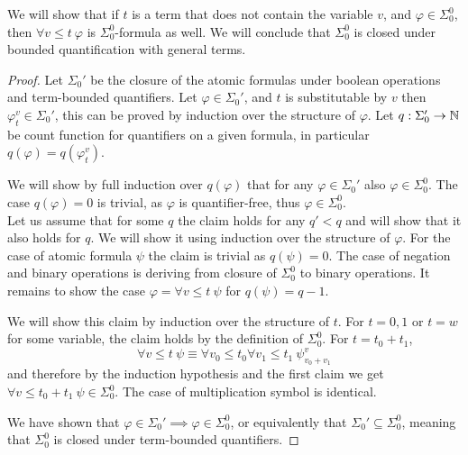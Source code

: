\question{}
We will show that if $t$ is a term that does not contain the variable $v$, and $\varphi \in \Sigma_0^0$,
then $\forall v \le t\ \varphi$ is $\Sigma_0^0$-formula as well.
We will conclude that $\Sigma_0^0$ is closed under bounded quantification with general terms.
\begin{proof}
	Let $\Sigma_0'$ be the closure of the atomic formulas under boolean operations and term-bounded quantifiers.
	Let $\varphi \in \Sigma_0'$, and $t$ is substitutable by $v$ then $\varphi_t^v \in \Sigma_0'$, this can be proved by induction over the structure of $\varphi$.
	Let $q : \Sigma_0' \to \mathbb{N}$ be count function for quantifiers on a given formula, in particular $q(\varphi) = q(\varphi_t^v)$.
	
	We will show by full induction over $q(\varphi)$ that for any $\varphi \in \Sigma_0'$ also $\varphi \in \Sigma_0^0$.
	The case $q(\varphi) = 0$ is trivial, as $\varphi$ is quantifier-free, thus $\varphi \in \Sigma_0^0$. \\
	Let us assume that for some $q$ the claim holds for any $q' < q$ and will show that it also holds for $q$.
	We will show it using induction over the structure of $\varphi$.
	For the case of atomic formula $\psi$ the claim is trivial as $q(\psi) = 0$.
	The case of negation and binary operations is deriving from closure of $\Sigma_0^0$ to binary operations.
	It remains to show the case $\varphi = \forall v \le t\ \psi$ for $q(\psi) = q - 1$.

	We will show this claim by induction over the structure of $t$.
	For $t = 0, 1$ or $t = w$ for some variable, the claim holds by the definition of $\Sigma_0^0$.
	For $t = t_0 + t_1$,
	\[
		\forall v \le t\ \psi
		\equiv \forall v_0 \le t_0 \forall v_1 \le t_1\ \psi_{v_0 + v_1}^v
	\]
	and therefore by the induction hypothesis and the first claim we get $\forall v \le t_0 + t_1\ \psi \in \Sigma_0^0$.
	The case of multiplication symbol is identical.

	We have shown that $\varphi \in \Sigma_0' \implies \varphi \in \Sigma_0^0$, or equivalently that $\Sigma_0' \subseteq \Sigma_0^0$,
	meaning that $\Sigma_0^0$ is closed under term-bounded quantifiers.
\end{proof}

